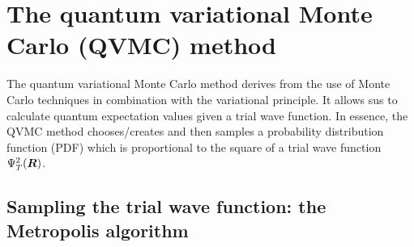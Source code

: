 \section{The quantum variational Monte Carlo (QVMC) method}

The quantum variational Monte Carlo method derives from the use of Monte Carlo techniques in combination with the variational principle. It allows sus to 
calculate quantum expectation values given a trial wave function. In essence, the QVMC method chooses/creates and then samples a probability distribution function (PDF) which is proportional to the square of a trial wave function $\Psi_{T}^{2}(\boldsymbol{R})$.


\subsection{Sampling the trial wave function: the Metropolis algorithm}

